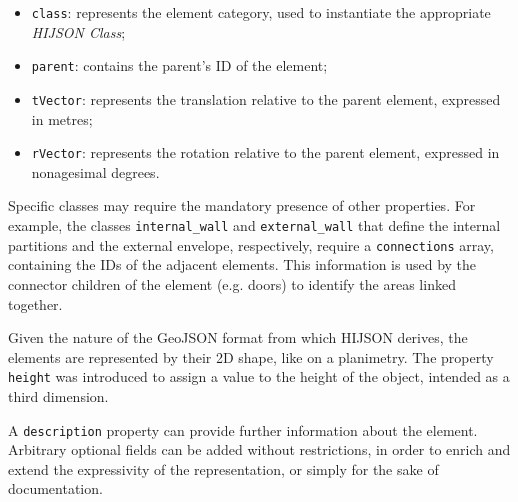 \begin{itemize}
\itemsep1pt\parskip0pt
\item
 {\tt class}: represents the element category, used to instantiate
 the appropriate \emph{HIJSON Class};
\item
 {\tt parent}: contains the parent's ID of the element;
\item
 {\tt tVector}: represents the translation relative to 
 the parent element, expressed in metres;
\item
 {\tt rVector}: represents the rotation relative to 
 the parent element, expressed in nonagesimal degrees.
\end{itemize}

Specific classes may require the mandatory presence of other properties. For
example, the classes {\tt internal\_wall} and {\tt external\_wall} that
define the internal partitions and the external envelope, respectively, require a {\tt connections}
array, containing the IDs of the adjacent elements. This information is used
by the connector children of the element (e.g. doors) to identify the
areas linked together.

Given the nature of the GeoJSON format from which HIJSON derives, the elements
are represented by their 2D shape, like on a planimetry. The property {\tt
height} was introduced to assign a value to the height of the object, intended
as a third dimension.

A {\tt description} property can provide further information about
the element.
Arbitrary optional fields can be added without restrictions, in order to
enrich and extend the expressivity of the representation, or simply for the sake of 
documentation.
